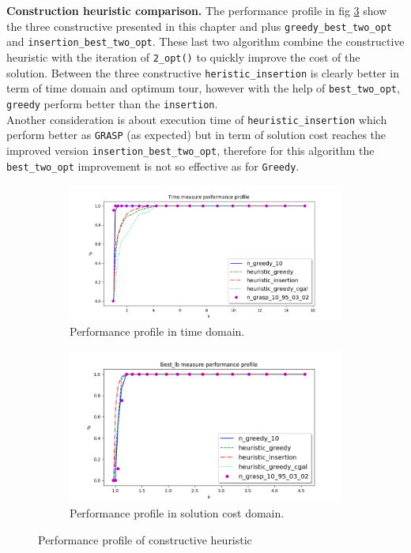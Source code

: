 \textbf{Construction heuristic comparison.} The performance profile in fig \ref{fig:pp_Lconstructives} show the three constructive presented in this chapter and plus \texttt{greedy\_best\_two\_opt} and \texttt{insertion\_best\_two\_opt}. These last two algorithm combine the constructive heuristic with the iteration of \texttt{2\_opt()} to quickly improve the cost of the solution. Between the three constructive \texttt{heristic\_insertion} is clearly better in term of time domain and optimum tour, however with the help of 
\texttt{best\_two\_opt}, \texttt{greedy} perform better than the \texttt{insertion}.\\
Another consideration is about execution time of \texttt{heuristic\_insertion} which perform better as \texttt{GRASP} (as expected) but in term of solution cost reaches the improved version \texttt{insertion\_best\_two\_opt}, therefore for this algorithm the \texttt{best\_two\_opt} improvement is not so effective as for \texttt{Greedy}.

\begin{figure}[!h]
	\centering
	\begin{subfigure}{.9\textwidth}
		\centering
		\includegraphics[width=\columnwidth]{../res/Lconstructives_LA_time.png}
		\caption{Performance profile in time domain.}
		\label{fig:Lconstructives_time}
	\end{subfigure}
	\begin{subfigure}{.9\textwidth}
	\centering
	\includegraphics[width=\columnwidth]{../res/Lconstructives_LA_lb.png}
	\caption{Performance profile in solution cost domain.}
	\label{fig:Lconstructives_lb}
	\end{subfigure}
	\caption{Performance profile of constructive heuristic}
	\label{fig:pp_Lconstructives}
\end{figure}

